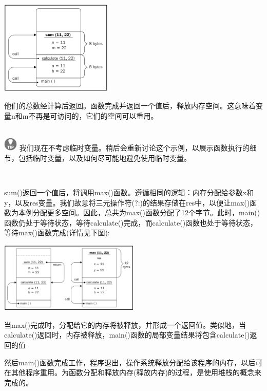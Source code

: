 \begin{center}
	\includegraphics[width=0.4\textwidth]{content/Section-1/Chapter-2/2}
\end{center}

他们的总数经计算后返回。函数完成并返回一个值后，释放内存空间。这意味着变量n和m不再是可访问的，它们的空间可以重用。 \par

\hspace*{\fill} \\ %
\includegraphics[width=0.05\textwidth]{images/tip}
我们现在不考虑临时变量。稍后会重新讨论这个示例，以展示函数执行的细节，包括临时变量，以及如何尽可能地避免使用临时变量。 \par
\noindent\textbf{}\ \par

sum()返回一个值后，将调用max()函数。遵循相同的逻辑：内存分配给参数x和y，以及res变量。我们故意将三元操作符(?:)的结果存储在res中，以便让max()函数为本例分配更多空间。因此，总共为max()函数分配了12个字节。此时，main()函数仍处于等待状态，等待calculate()完成，而calculate()函数也处于等待状态，等待max()函数完成(详情见下图):\par

\begin{center}
	\includegraphics[width=0.5\textwidth]{content/Section-1/Chapter-2/3}
\end{center}

当max()完成时，分配给它的内存将被释放，并形成一个返回值。类似地，当calculate()返回时，内存被释放，main()函数的局部变量结果将包含calculate()返回的值\par
然后main()函数完成工作，程序退出，操作系统释放分配给该程序的内存，以后可在其他程序重用。为函数分配和释放内存(释放内存)的过程，是使用堆栈的概念来完成的。\par


